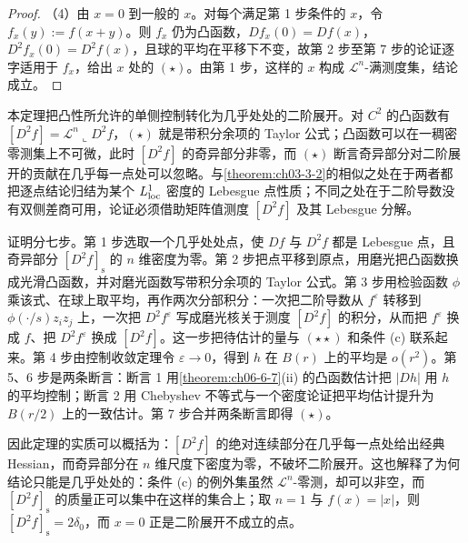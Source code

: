 \documentclass[../../main.tex]{subfiles}%
\begin{document}
\begin{proof}
（4）由 $x=0$ 到一般的 $x$。对每个满足第 1 步条件的 $x$，令 $f_{x}(y):=f(x+y)$。则 $f_{x}$ 仍为凸函数，$Df_{x}(0)=Df(x)$，$D^{2}f_{x}(0)=D^{2}f(x)$，且球的平均在平移下不变，故第 2 步至第 7 步的论证逐字适用于 $f_{x}$，给出 $x$ 处的 $(\star)$。由第 1 步，这样的 $x$ 构成 $\mathcal{L}^{n}$-满测度集，结论成立。
\end{proof}

\begin{remark}\label{remark:ch06-thm-6-9-动机}
本定理把凸性所允许的单侧控制转化为几乎处处的二阶展开。对 $C^{2}$ 的凸函数有 $[D^{2}f]=\mathcal{L}^{n}\llcorner D^{2}f$，$(\star)$ 就是带积分余项的 Taylor 公式；凸函数可以在一稠密零测集上不可微，此时 $[D^{2}f]$ 的奇异部分非零，而 $(\star)$ 断言奇异部分对二阶展开的贡献在几乎每一点处可以忽略。与\cref{theorem:ch03-3-2}的相似之处在于两者都把逐点结论归结为某个 $L^{1}_{\mathrm{loc}}$ 密度的 Lebesgue 点性质；不同之处在于二阶导数没有双侧差商可用，论证必须借助矩阵值测度 $[D^{2}f]$ 及其 Lebesgue 分解。%

证明分七步。第 1 步选取一个几乎处处点，使 $Df$ 与 $D^{2}f$ 都是 Lebesgue 点，且奇异部分 $[D^{2}f]_{\mathrm{s}}$ 的 $n$ 维密度为零。第 2 步把点平移到原点，用磨光把凸函数换成光滑凸函数，并对磨光函数写带积分余项的 Taylor 公式。第 3 步用检验函数 $\phi$ 乘该式、在球上取平均，再作两次分部积分：一次把二阶导数从 $f^{\varepsilon}$ 转移到 $\phi(\cdot/s)z_{i}z_{j}$ 上，一次把 $D^{2}f^{\varepsilon}$ 写成磨光核关于测度 $[D^{2}f]$ 的积分，从而把 $f^{\varepsilon}$ 换成 $f$、把 $D^{2}f^{\varepsilon}$ 换成 $[D^{2}f]$。这一步把待估计的量与 $(\star\star)$ 和条件 (c) 联系起来。第 4 步由控制收敛定理令 $\varepsilon\to0$，得到 $h$ 在 $B(r)$ 上的平均是 $o(r^{2})$。第 5、6 步是两条断言：断言 1 用\cref{theorem:ch06-6-7}(ii) 的凸函数估计把 $\lvert Dh\rvert$ 用 $h$ 的平均控制；断言 2 用 Chebyshev 不等式与一个密度论证把平均估计提升为 $B(r/2)$ 上的一致估计。第 7 步合并两条断言即得 $(\star)$。%

因此定理的实质可以概括为：$[D^{2}f]$ 的绝对连续部分在几乎每一点处给出经典 Hessian，而奇异部分在 $n$ 维尺度下密度为零，不破坏二阶展开。这也解释了为何结论只能是几乎处处的：条件 (c) 的例外集虽然 $\mathcal{L}^{n}$-零测，却可以非空，而 $[D^{2}f]_{\mathrm{s}}$ 的质量正可以集中在这样的集合上；取 $n=1$ 与 $f(x)=\lvert x\rvert$，则 $[D^{2}f]_{\mathrm{s}}=2\delta_{0}$，而 $x=0$ 正是二阶展开不成立的点。
\end{remark}
\end{document}
